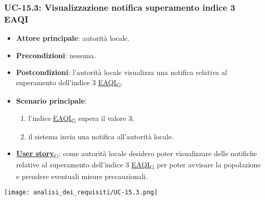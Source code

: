 \subsubsection{UC-15.3: Visualizzazione notifica superamento indice 3 EAQI}
\begin{itemize}
	\item \textbf{Attore principale}: autorità locale.
	\item \textbf{Precondizioni}: nessuna.
	\item \textbf{Postcondizioni}: l'autorità locale visualizza una notifica relativa al superamento dell'indice 3 \href{https://7last.github.io/docs/pb/documentazione-interna/glossario\#european-air-quality-index}{EAQI\textsubscript{G}}.
	\item \textbf{Scenario principale}:
	      \begin{enumerate}
		      \item l'indice \href{https://7last.github.io/docs/pb/documentazione-interna/glossario\#european-air-quality-index}{EAQI\textsubscript{G}} supera il valore 3;
		      \item il sistema invia una notifica all'autorità locale.
	      \end{enumerate}
	\item \href{https://7last.github.io/docs/pb/documentazione-interna/glossario\#user-story}{\textbf{User story}\textsubscript{G}}:
	      come autorità locale desidero poter visualizzare delle notifiche relative al superamento dell'indice 3 \href{https://7last.github.io/docs/pb/documentazione-interna/glossario\#european-air-quality-index}{EAQI\textsubscript{G}}
	      per poter avvisare la popolazione e prendere eventuali misure precauzionali.
\end{itemize}
\begin{center}
	\texttt{[image: analisi\_dei\_requisiti/UC-15.3.png]}
\end{center}

